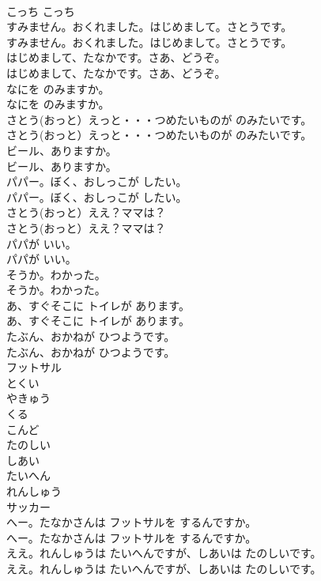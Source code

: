 \documentclass[8pt]{extreport}
\begin{document}
\begin{CJK}{UTF8}{min}
\\	こっち こっち
\\	すみません。おくれました。はじめまして。さとうです。
\\	すみません。おくれました。はじめまして。さとうです。
\\	はじめまして、たなかです。さあ、どうぞ。
\\	はじめまして、たなかです。さあ、どうぞ。
\\	なにを のみますか。
\\	なにを のみますか。
\\	さとう(おっと）えっと・・・つめたいものが のみたいです。
\\	さとう(おっと）えっと・・・つめたいものが のみたいです。
\\	ビール、ありますか。
\\	ビール、ありますか。
\\	パパー。ぼく、おしっこが したい。
\\	パパー。ぼく、おしっこが したい。
\\	さとう(おっと）ええ？ママは？
\\	さとう(おっと）ええ？ママは？
\\	パパが いい。
\\	パパが いい。
\\	そうか。わかった。
\\	そうか。わかった。
\\	あ、すぐそこに トイレが あります。
\\	あ、すぐそこに トイレが あります。
\\	たぶん、おかねが ひつようです。
\\	たぶん、おかねが ひつようです。
\\	フットサル
\\	とくい
\\	やきゅう
\\	くる
\\	こんど
\\	たのしい
\\	しあい
\\	たいへん
\\	れんしゅう
\\	サッカー
\\	へー。たなかさんは フットサルを するんですか。
\\	へー。たなかさんは フットサルを するんですか。
\\	ええ。れんしゅうは たいへんですが、しあいは たのしいです。
\\	ええ。れんしゅうは たいへんですが、しあいは たのしいです。

\end{CJK}
\end{document}
